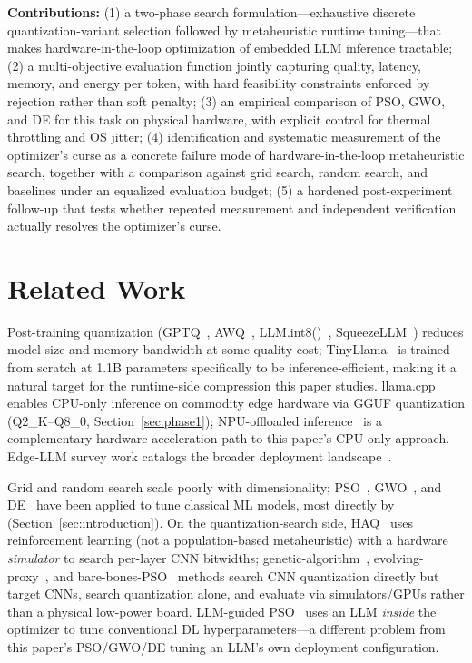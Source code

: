\documentclass[conference, letterpaper]{IEEEtran}
\begin{document}
\textbf{Contributions:} (1) a two-phase search formulation---exhaustive discrete quantization-variant selection followed by metaheuristic runtime tuning---that makes hardware-in-the-loop optimization of embedded LLM inference tractable; (2) a multi-objective evaluation function jointly capturing quality, latency, memory, and energy per token, with hard feasibility constraints enforced by rejection rather than soft penalty; (3) an empirical comparison of PSO, GWO, and DE for this task on physical hardware, with explicit control for thermal throttling and OS jitter; (4) identification and systematic measurement of the optimizer's curse as a concrete failure mode of hardware-in-the-loop metaheuristic search, together with a comparison against grid search, random search, and baselines under an equalized evaluation budget; (5) a hardened post-experiment follow-up that tests whether repeated measurement and independent verification actually resolves the optimizer's curse.

\section{Related Work}
\label{sec:related}

Post-training quantization (GPTQ~\cite{ref4}, AWQ~\cite{ref5}, LLM.int8()~\cite{ref6}, SqueezeLLM~\cite{ref7}) reduces model size and memory bandwidth at some quality cost; TinyLlama~\cite{ref1} is trained from scratch at 1.1B parameters specifically to be inference-efficient, making it a natural target for the runtime-side compression this paper studies. llama.cpp~\cite{ref3} enables CPU-only inference on commodity edge hardware via GGUF quantization (Q2\_K--Q8\_0, Section~\ref{sec:phase1}); NPU-offloaded inference~\cite{ref18} is a complementary hardware-acceleration path to this paper's CPU-only approach. Edge-LLM survey work catalogs the broader deployment landscape~\cite{ref17}.

Grid and random search scale poorly with dimensionality; PSO~\cite{ref8}, GWO~\cite{ref9}, and DE~\cite{ref10} have been applied to tune classical ML models, most directly by~\cite{ref11} (Section~\ref{sec:introduction}). On the quantization-search side, HAQ~\cite{ref12} uses reinforcement learning (not a population-based metaheuristic) with a hardware \emph{simulator} to search per-layer CNN bitwidths; genetic-algorithm~\cite{ref13}, evolving-proxy~\cite{ref14}, and bare-bones-PSO~\cite{ref15} methods search CNN quantization directly but target CNNs, search quantization alone, and evaluate via simulators/GPUs rather than a physical low-power board. LLM-guided PSO~\cite{ref16} uses an LLM \emph{inside} the optimizer to tune conventional DL hyperparameters---a different problem from this paper's PSO/GWO/DE tuning an LLM's own deployment configuration.
\end{document}

